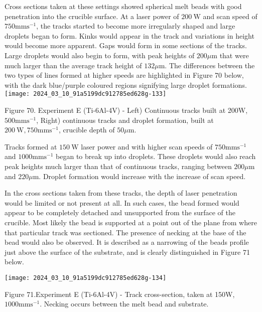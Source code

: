 \documentclass[10pt]{article}
\begin{document}
Cross sections taken at these settings showed spherical melt beads with good penetration into the crucible surface. At a laser power of $200 \mathrm{~W}$ and scan speed of $750 \mathrm{mms}^{-1}$, the tracks started to become more irregularly shaped and large droplets began to form. Kinks would appear in the track and variations in height would become more apparent. Gaps would form in some sections of the tracks. Large droplets would also begin to form, with peak heights of $200 \mu \mathrm{m}$ that were much larger than the average track height of $132 \mu \mathrm{m}$. The differences between the two types of lines formed at higher speeds are highlighted in Figure 70 below, with the dark blue/purple coloured regions signifying large droplet formations.\\
\texttt{[image: 2024\_03\_10\_91a5199dc912785ed628g-133]}

Figure 70. Experiment E (Ti-6Al-4V) - Left) Continuous tracks built at 200W, $500 \mathrm{mms}^{-1}$, Right) continuous tracks and droplet formation, built at $200 \mathrm{~W}, 750 \mathrm{mms}^{-1}$, crucible depth of $50 \mu \mathrm{m}$.

Tracks formed at $150 \mathrm{~W}$ laser power and with higher scan speeds of $750 \mathrm{mms}^{-1}$ and $1000 \mathrm{mms}^{-1}$ began to break up into droplets. These droplets would also reach peak heights much larger than that of continuous tracks, ranging between $200 \mu \mathrm{m}$ and $220 \mu \mathrm{m}$. Droplet formation would increase with the increase of scan speed.

In the cross sections taken from these tracks, the depth of laser penetration would be limited or not present at all. In such cases, the bead formed would appear to be completely detached and unsupported from the surface of the crucible. Most likely the bead is supported at a point out of the plane from where that particular track was sectioned. The presence of necking at the base of the bead would also be observed. It is described as a narrowing of the beads profile just above the surface of the substrate, and is clearly distinguished in Figure 71 below.

\begin{center}
\texttt{[image: 2024\_03\_10\_91a5199dc912785ed628g-134]}
\end{center}

Figure 71.Experiment E (Ti-6Al-4V) - Track cross-section, taken at 150W, $1000 \mathrm{mms}^{-1}$. Necking occurs between the melt bead and substrate.
\end{document}
